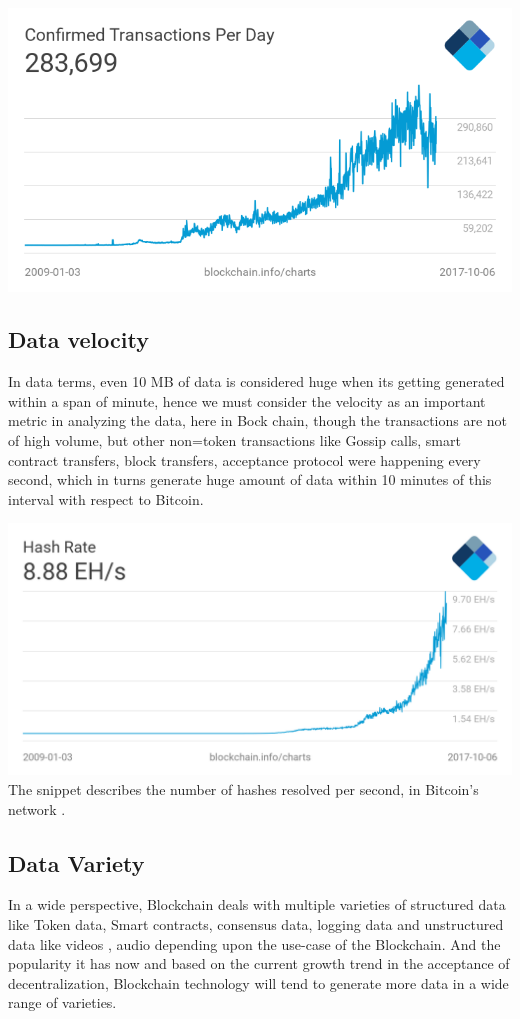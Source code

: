 \documentclass[sigconf]{acmart}
\begin{document}
\includegraphics[scale=0.35]{images/bitcoin-trans.png}
\subsection{Data velocity}
In data terms, even 10 MB of data is considered huge when its getting generated within a span of minute, hence we must consider the velocity as an important metric in analyzing the data, here in Bock chain, though the transactions are not of high volume, but other non=token transactions like Gossip calls, smart contract transfers, block transfers, acceptance protocol were happening every second, which in turns generate huge amount of data within 10 minutes of this interval with respect to Bitcoin.

\includegraphics[scale=0.2]{images/hash-rate.png}
The snippet describes the number of hashes resolved per second, in Bitcoin's network \cite{hastratepersec}.

\subsection{Data Variety}
In a wide perspective, Blockchain deals with multiple varieties of structured data like Token data, Smart contracts, consensus data, logging data and unstructured data like videos \cite{livepeer-BC-stream}, audio depending upon the use-case of the Blockchain. And the popularity it has now and based on the current growth trend in the acceptance of decentralization, Blockchain technology will tend to generate more data in a wide range of varieties.
\end{document}
